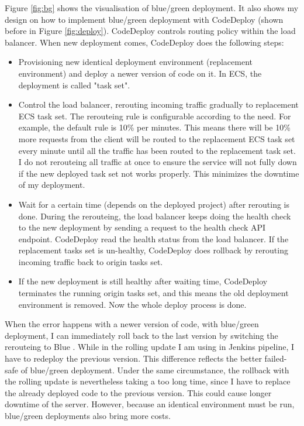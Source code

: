 \par
Figure \ref{fig:bg} shows the visualisation of blue/green deployment. It also shows my design on how to implement blue/green deployment with CodeDeploy (shown before in Figure \ref{fig:deploy}). CodeDeploy controls routing policy within the load balancer. When new deployment comes, CodeDeploy does the following steps:
\begin{itemize}
 \item Provisioning new identical deployment environment (replacement environment) and deploy a newer version of code on it. In ECS, the deployment is called "task set".
 \item Control the load balancer, rerouting incoming traffic gradually to replacement ECS task set. The rerouteing rule is configurable according to the need. For example, the default rule is 10\% per minutes. This means there will be 10\% more requests from the client will be routed to the replacement ECS task set every minute until all the traffic has been routed to the replacement task set. I do not rerouteing all traffic at once to ensure the service will not fully down if the new deployed task set not works properly. This minimizes the downtime of my deployment.
 \item Wait for a certain time (depends on the deployed project) after rerouting is done. During the rerouteing, the load balancer keeps doing the health check to the new deployment by sending a request to the health check API endpoint. CodeDeploy read the health status from the load balancer. If the replacement tasks set is un-healthy, CodeDeploy does rollback by rerouting incoming traffic back to origin tasks set.
 \item If the new deployment is still healthy after waiting time, CodeDeploy terminates the running origin tasks set, and this means the old deployment environment is removed. Now the whole deploy process is done.
\end{itemize}
 When the error happens with a newer version of code, with blue/green deployment, I can immediately roll back to the last version by switching the rerouteing to Blue \cite{UsingBlu65:online}. While in the rolling update I am using in Jenkins pipeline, I have to redeploy the previous version. This difference reflects the better failed-safe of blue/green deployment. Under the same circumstance, the rollback with the rolling update is nevertheless taking a too long time, since I have to replace the already deployed code to the previous version. This could cause longer downtime of the server. However, because an identical environment must be run, blue/green deployments also bring more costs.
